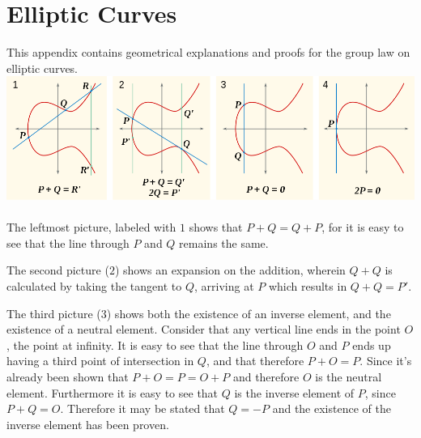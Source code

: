 \chapter{Elliptic Curves} \label{AppA}
This appendix contains geometrical explanations and proofs for the group law on elliptic curves.
\\
\includegraphics[width=\textwidth]{EllCurves}
\\
\\
The leftmost picture, labeled with $1$ shows that $P+Q=Q+P$, for it is easy to see that the line through $P$ and $Q$ remains the same.

The second picture ($2$) shows an expansion on the addition, wherein $Q+Q$ is calculated by taking the tangent to $Q$, arriving at $P$ which results in $Q+Q=P'$.

The third picture ($3$) shows both the existence of an inverse element, and the existence of a neutral element. Consider that any vertical line ends in the point $O$, the point at infinity. It is easy to see that the line through $O$ and $P$ ends up having a third point of intersection in $Q$, and that therefore $P+O=P$. Since it's already been shown that $P+O=P=O+P$ and therefore $O$ is the neutral element. Furthermore it is easy to see that $Q$ is the inverse element of $P$, since $P+Q=O$. Therefore it may be stated that $Q=-P$ and the existence of the inverse element has been proven.

